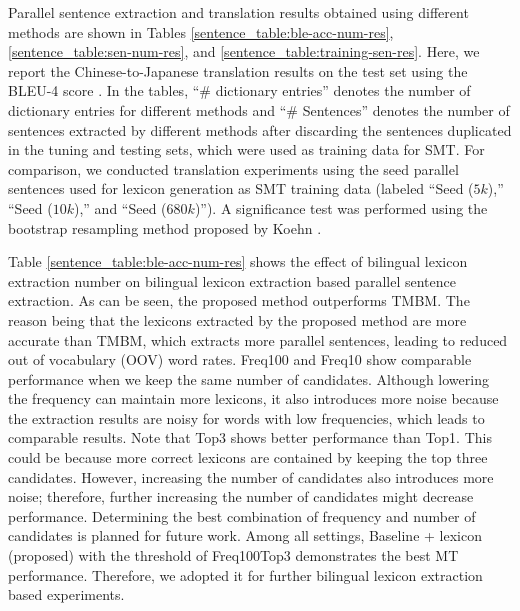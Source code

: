 \documentclass[english]{jnlp_1.4}
\begin{document}
Parallel sentence extraction and translation results obtained using different methods are shown in
Tables \ref{sentence_table:ble-acc-num-res}, \ref{sentence_table:sen-num-res}, and \ref{sentence_table:training-sen-res}.
Here, we report the Chinese-to-Japanese translation results 
on the test set using the BLEU-4 score \cite{papineni-EtAl:2002:ACL}. 
In the tables, ``\# dictionary entries'' denotes the number of dictionary entries for different methods and
``\# Sentences'' denotes the number of sentences extracted by different methods
after discarding the sentences duplicated in the tuning and testing sets, which 
were used as training data for SMT.
For comparison, we conducted translation experiments using the seed parallel sentences
used for lexicon generation as SMT training data
(labeled ``Seed ($5k$),'' ``Seed ($10k$),'' and ``Seed ($680k$)'').
A significance test was performed using the bootstrap resampling 
method proposed by Koehn \citeyear{koehn:2004:EMNLP}.

\begin{table}[b]
\label{sentence_table:ble-acc-num-res}

\end{table}

Table \ref{sentence_table:ble-acc-num-res} shows the effect of bilingual lexicon extraction number 
on bilingual lexicon extraction based parallel sentence extraction. As can be seen, the proposed 
method outperforms TMBM. The reason being that the lexicons extracted by the proposed method are 
more accurate than TMBM, which extracts more parallel sentences, leading to reduced out of 
vocabulary (OOV) word rates. Freq100 and Freq10 show comparable performance when we keep the 
same number of candidates. Although lowering the frequency can maintain more lexicons, it also 
introduces more noise because the extraction results are noisy for words with low frequencies, 
which leads to comparable results. Note that Top3 shows better performance than Top1. This could 
be because more correct lexicons are contained by keeping the top three candidates. However, 
increasing the number of candidates also introduces more noise; therefore, further increasing 
the number of candidates might decrease performance. Determining the best combination of frequency 
and number of candidates is planned for future work. Among all settings, Baseline + lexicon (proposed) 
with the threshold of Freq100Top3 demonstrates the best MT performance. Therefore, we adopted it 
for further bilingual lexicon extraction based experiments.
\end{document}
